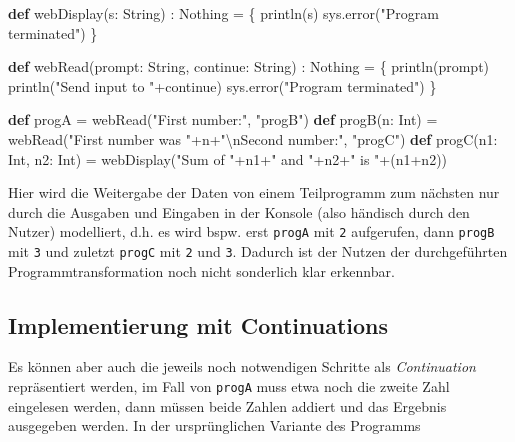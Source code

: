 \documentclass[]{article}
\newenvironment{Shaded}{}{}
\newcommand{\CharTok}[1]{\textcolor[rgb]{0.25,0.44,0.63}{#1}}
\newcommand{\FunctionTok}[1]{\textcolor[rgb]{0.02,0.16,0.49}{#1}}
\newcommand{\KeywordTok}[1]{\textcolor[rgb]{0.00,0.44,0.13}{\textbf{#1}}}
\newcommand{\NormalTok}[1]{#1}
\newcommand{\StringTok}[1]{\textcolor[rgb]{0.25,0.44,0.63}{#1}}
\begin{document}
\begin{Shaded}
\begin{Highlighting}[]
\KeywordTok{def} \FunctionTok{webDisplay}\NormalTok{(s: String) : Nothing = \{}
  \FunctionTok{println}\NormalTok{(s)}
\NormalTok{  sys.}\FunctionTok{error}\NormalTok{(}\StringTok{"Program terminated"}\NormalTok{)}
\NormalTok{\}}

\KeywordTok{def} \FunctionTok{webRead}\NormalTok{(prompt: String, continue: String) : Nothing = \{}
  \FunctionTok{println}\NormalTok{(prompt)}
  \FunctionTok{println}\NormalTok{(}\StringTok{"Send input to "}\NormalTok{+continue)}
\NormalTok{  sys.}\FunctionTok{error}\NormalTok{(}\StringTok{"Program terminated"}\NormalTok{)}
\NormalTok{\}}

\KeywordTok{def}\NormalTok{ progA = }\FunctionTok{webRead}\NormalTok{(}\StringTok{"First number:"}\NormalTok{, }\StringTok{"progB"}\NormalTok{)}
\KeywordTok{def} \FunctionTok{progB}\NormalTok{(n: Int) = }\FunctionTok{webRead}\NormalTok{(}\StringTok{"First number was "}\NormalTok{+n+}\StringTok{"}\CharTok{\textbackslash{}n}\StringTok{Second number:"}\NormalTok{, }\StringTok{"progC"}\NormalTok{)}
\KeywordTok{def} \FunctionTok{progC}\NormalTok{(n1: Int, n2: Int) = }\FunctionTok{webDisplay}\NormalTok{(}\StringTok{"Sum of "}\NormalTok{+n1+}\StringTok{" and "}\NormalTok{+n2+}\StringTok{" is "}\NormalTok{+(n1+n2))}
\end{Highlighting}
\end{Shaded}

Hier wird die Weitergabe der Daten von einem Teilprogramm zum nächsten
nur durch die Ausgaben und Eingaben in der Konsole (also händisch durch
den Nutzer) modelliert, d.h. es wird bspw. erst \texttt{progA} mit
\texttt{2} aufgerufen, dann \texttt{progB} mit \texttt{3} und zuletzt
\texttt{progC} mit \texttt{2} und \texttt{3}. Dadurch ist der Nutzen der
durchgeführten Programmtransformation noch nicht sonderlich klar
erkennbar.

\hypertarget{implementierung-mit-continuations}{%
\subsection{Implementierung mit
Continuations}\label{implementierung-mit-continuations}}

Es können aber auch die jeweils noch notwendigen Schritte als
\emph{Continuation} repräsentiert werden, im Fall von \texttt{progA}
muss etwa noch die zweite Zahl eingelesen werden, dann müssen beide
Zahlen addiert und das Ergebnis ausgegeben werden. In der ursprünglichen
Variante des Programms
\end{document}
